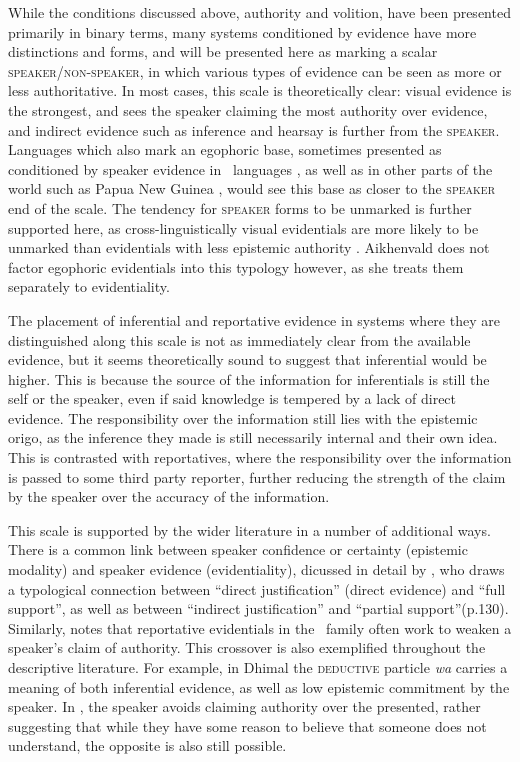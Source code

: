 While the conditions discussed above, authority and volition, have been presented primarily in binary terms, many systems conditioned by evidence have more distinctions and forms, and will be presented here as marking a scalar \textsc{speaker}/\textsc{non-speaker}, in which various types of evidence can be seen as more or less authoritative. In most cases, this scale is theoretically clear: visual evidence is the strongest, and sees the speaker claiming the most authority over evidence, and indirect evidence such as inference and hearsay is further from the \textsc{speaker}. Languages which also mark an egophoric base, sometimes presented as conditioned by speaker evidence in \lfam\ languages \cite{Hill2017}, as well as in other parts of the world such as Papua New Guinea \cite{SanRoque2012}, would see this base as closer to the \textsc{speaker} end of the scale. The tendency for \textsc{speaker} forms to be unmarked is further supported here, as cross-linguistically visual evidentials are more likely to be unmarked than evidentials with less epistemic authority \cite[73]{Aikhenvald2004}. Aikhenvald does not factor egophoric evidentials into this typology however, as she treats them separately to evidentiality.

The placement of inferential and reportative evidence in systems where they are distinguished along this scale is not as immediately clear from the available evidence, but it seems theoretically sound to suggest that inferential would be higher. This is because the source of the information for inferentials is still the self or the speaker, even if said knowledge is tempered by a lack of direct evidence. The responsibility over the information still lies with the epistemic origo, as the inference they made is still necessarily internal and their own idea. This is contrasted with reportatives, where the responsibility over the information is passed to some third party reporter, further reducing the strength of the claim by the speaker over the accuracy of the information.

This scale is supported by the wider literature in a number of additional ways. There is a common link between speaker confidence or certainty (epistemic modality) and speaker evidence (evidentiality), dicussed in detail by , who draws a typological connection between ``direct justification'' (direct evidence) and ``full support'', as well as between ``indirect justification'' and ``partial support''(p.130). Similarly,  notes that reportative evidentials in the \lfam\ family often work to weaken a speaker's claim of authority. This crossover is also exemplified throughout the descriptive literature. For example, in Dhimal \cite[Dhimalish: India,][245]{King2009} the \textsc{deductive} particle \textit{wa} carries a meaning of both inferential evidence, as well as low epistemic commitment by the speaker. In , the speaker avoids claiming authority over the presented, rather suggesting that while they have some reason to believe that someone does not understand, the opposite is also still possible.

